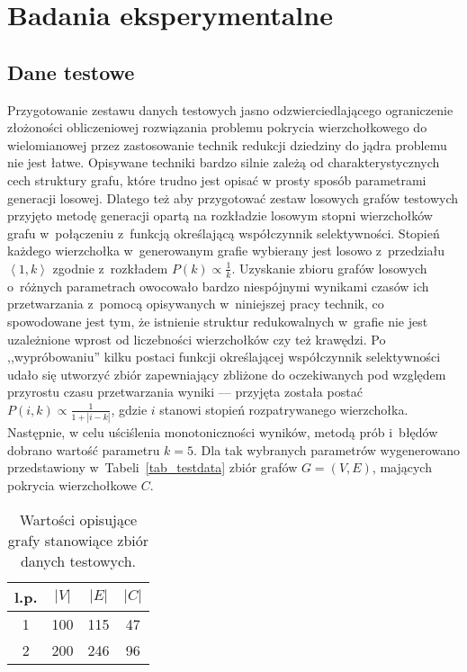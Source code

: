 \chapter{Badania eksperymentalne}
\label{results}
\section{Dane testowe}
\par{
  Przygotowanie zestawu danych testowych jasno odzwierciedlającego ograniczenie złożoności obliczeniowej rozwiązania problemu pokrycia wierzchołkowego do wielomianowej przez zastosowanie technik redukcji dziedziny do jądra problemu nie jest łatwe.
  Opisywane techniki bardzo silnie zależą od charakterystycznych cech struktury grafu, które trudno jest opisać w prosty sposób parametrami generacji losowej.
  Dlatego też aby przygotować zestaw losowych grafów testowych przyjęto metodę generacji opartą na rozkładzie losowym stopni wierzchołków grafu w~połączeniu z~funkcją określającą współczynnik selektywności.
  Stopień każdego wierzchołka w~generowanym grafie wybierany jest losowo z~przedziału $\left<1, k\right>$ zgodnie z~rozkładem $P(k) \propto \frac{1}{k}$.
  Uzyskanie zbioru grafów losowych o~różnych parametrach owocowało bardzo niespójnymi wynikami czasów ich przetwarzania z~pomocą opisywanych w~niniejszej pracy technik, co spowodowane jest tym, że istnienie struktur redukowalnych w~grafie nie jest uzależnione wprost od liczebności wierzchołków czy też krawędzi.
  Po ,,wypróbowaniu'' kilku postaci funkcji określającej współczynnik selektywności udało się utworzyć zbiór zapewniający zbliżone do oczekiwanych pod względem przyrostu czasu przetwarzania wyniki --- przyjęta została postać $P(i, k) \propto \frac{1}{1+|i-k|}$, gdzie $i$ stanowi stopień rozpatrywanego wierzchołka.
  Następnie, w celu uściślenia monotoniczności wyników, metodą prób i~błędów dobrano wartość parametru $k=5$.
  Dla tak wybranych parametrów wygenerowano przedstawiony w~Tabeli~\ref{tab_testdata} zbiór grafów $G=(V, E)$, mających pokrycia wierzchołkowe $C$.\\
  \begin{table}
    \begin{center}
    \caption{Wartości opisujące grafy stanowiące zbiór danych testowych.}
    \begin{tabular}{| c | c | c | c |}
      \hline
      l.p. & $|V|$ & $|E|$ & $|C|$ \\ \hline
      1 & 100 & 115 & 47 \\
      2 & 200 & 246 & 96 \\

\end{tabular}
\end{center}
\end{table}}
